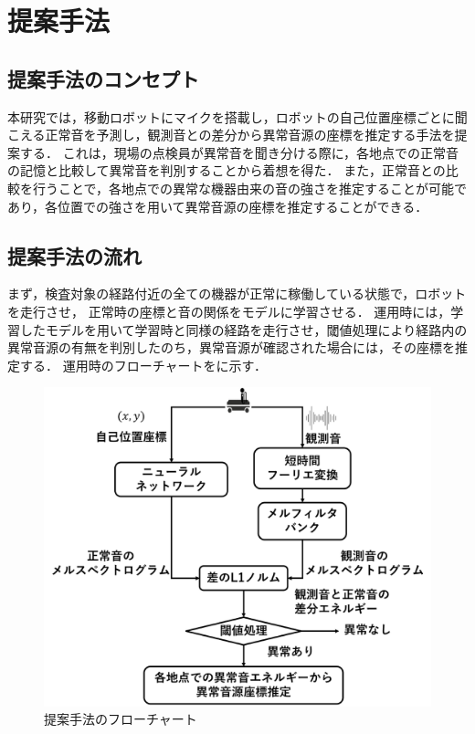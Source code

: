 \documentclass[../main]{subfiles}
\begin{document}
\graphicspath{{../figures/}}

\section{提案手法}


\subsection{提案手法のコンセプト}
本研究では，移動ロボットにマイクを搭載し，ロボットの自己位置座標ごとに聞こえる正常音を予測し，観測音との差分から異常音源の座標を推定する手法を提案する．
これは，現場の点検員が異常音を聞き分ける際に，各地点での正常音の記憶と比較して異常音を判別することから着想を得た．
また，正常音との比較を行うことで，各地点での異常な機器由来の音の強さを推定することが可能であり，各位置での強さを用いて異常音源の座標を推定することができる．

\subsection{提案手法の流れ}
まず，検査対象の経路付近の全ての機器が正常に稼働している状態で，ロボットを走行させ，
正常時の座標と音の関係をモデルに学習させる．
運用時には，学習したモデルを用いて学習時と同様の経路を走行させ，閾値処理により経路内の異常音源の有無を判別したのち，異常音源が確認された場合には，その座標を推定する．
運用時のフローチャートをに示す．
\begin{figure}[tb]
  \centering
  \includegraphics[keepaspectratio, width=1.0\linewidth]{flowchart.pdf}
  \caption{提案手法のフローチャート}
\end{figure}
\end{document}
